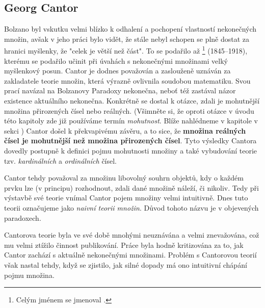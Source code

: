 \subsection{Georg Cantor}
\label{subsec:cantor}
Bolzano byl vskutku velmi blízko k odhalení a pochopení vlastností nekonečných množin, avšak v jeho práci bylo vidět, že stále nebyl schopen se plně dostat za hranici myšlenky, že "celek je větší než část". To se podařilo až \footnote{Celým jménem se jmenoval .} (1845--1918), kterému se podařilo učinit při úvahách s nekonečnými množinami velký myšlenkový posun. Cantor je dodnes považován a zaslouženě uznáván za zakladatele teorie množin, která výrazně ovlivnila soudobou matematiku. Svou prací navázal na Bolzanovy Paradoxy nekonečna, neboť též zastával názor existence aktuálního nekonečna. Konkrétně se dostal k otázce, zdali je mohutnější množina přirozených čísel nebo reálných. (Všimněte si, že oproti otázce v úvodu této kapitoly zde již používáme termín \emph{mohutnost}. Blíže nahlédneme v kapitole  v sekci ) Cantor došel k překvapivému závěru, a to sice, že \textbf{množina reálných čísel je mohutnější než množina přirozených čísel}. Tyto výsledky Cantora dovedly postupně k definici pojmu mohutnosti množiny a také vybudování teorie tzv. \emph{kardinálních} a \emph{ordinálních} čísel.\par
Cantor tehdy považoval za množinu libovolný souhrn objektů, kdy o každém prvku lze (v principu) rozhodnout, zdali dané množině náleží, či nikoliv. Tedy při výstavbě své teorie vnímal Cantor pojem množiny velmi intuitivně. Dnes tuto teorii označujeme jako \emph{naivní teorii množin}. Důvod tohoto názvu je v objevených paradoxech.\par
Cantorova teorie byla ve své době mnohými neuznávána a velmi znevažována, což mu velmi ztížilo činnost publikování. Práce byla hodně kritizována za to, jak Cantor zachází s aktuálně nekonečnými množinami. Problém s Cantorovou teorií však nastal tehdy, když se zjistilo, jak silné dopady má ono intuitivní chápání pojmu množina.


